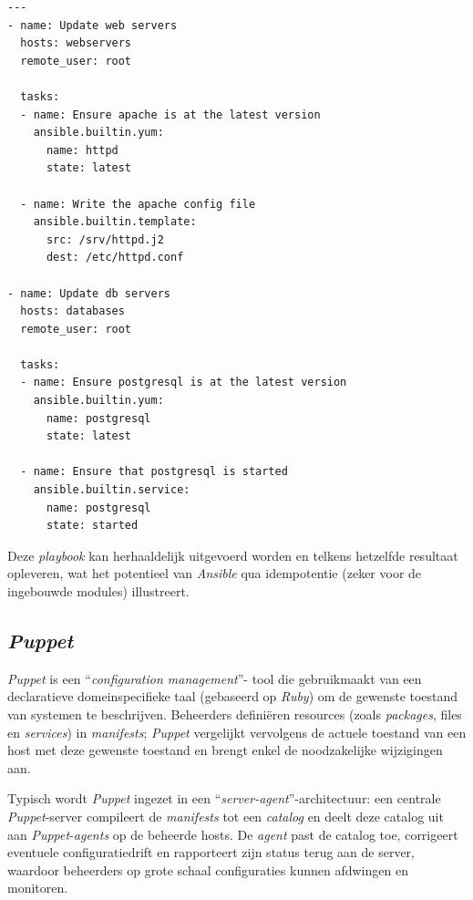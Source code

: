 \begin{codeblock}
  \begin{verbatim}
---
- name: Update web servers
  hosts: webservers
  remote_user: root

  tasks:
  - name: Ensure apache is at the latest version
    ansible.builtin.yum:
      name: httpd
      state: latest

  - name: Write the apache config file
    ansible.builtin.template:
      src: /srv/httpd.j2
      dest: /etc/httpd.conf

- name: Update db servers
  hosts: databases
  remote_user: root

  tasks:
  - name: Ensure postgresql is at the latest version
    ansible.builtin.yum:
      name: postgresql
      state: latest

  - name: Ensure that postgresql is started
    ansible.builtin.service:
      name: postgresql
      state: started
\end{verbatim}
  \caption[Voorbeeld \emph{Ansible}-\emph{playbook}]{Voorbeeld van een eenvoudige \emph{Ansible}-\emph{playbook} \autocite{Ansible2025a}.}
  \label{code:ansible_playbook_vb}
\end{codeblock}

Deze \emph{playbook} kan herhaaldelijk uitgevoerd worden en telkens hetzelfde resultaat opleveren, wat het potentieel van \emph{Ansible} qua idempotentie (zeker voor de ingebouwde modules) illustreert.

\subsection{\emph{Puppet}}%

\emph{Puppet} is een ``\emph{configuration management}''- tool die gebruikmaakt van een declaratieve domeinspecifieke taal (gebaseerd op \emph{Ruby}) om de gewenste toestand van systemen te beschrijven.
Beheerders definiëren resources (zoals \emph{packages}, files en \emph{services}) in \emph{manifests}; \emph{Puppet} vergelijkt vervolgens de actuele toestand van een host met deze gewenste toestand en brengt enkel de noodzakelijke wijzigingen aan. \autocite{Perforce2026a}

Typisch wordt \emph{Puppet} ingezet in een ``\emph{server-agent}''-architectuur: een centrale \emph{Puppet}-server compileert de \emph{manifests} tot een \emph{catalog} en deelt deze catalog uit aan \emph{Puppet}-\emph{\emph{agent}s} op de beheerde hosts.
De \emph{agent} past de catalog toe, corrigeert eventuele configuratiedrift en rapporteert zijn status terug aan de server, waardoor beheerders op grote schaal configuraties kunnen afdwingen en monitoren. \autocite{Perforce2026b}

